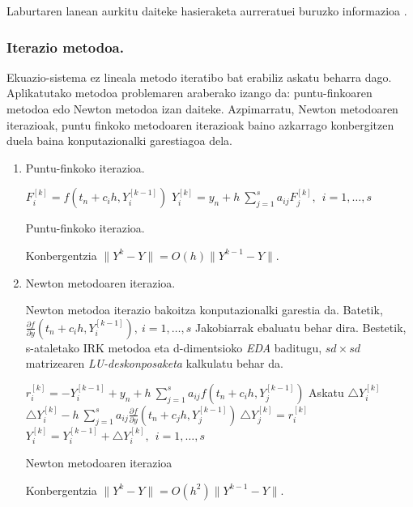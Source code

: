Laburtaren lanean aurkitu daiteke hasieraketa aurreratuei buruzko informazioa \cite{Laburta1998}.  


\subsubsection*{Iterazio metodoa.}

Ekuazio-sistema ez lineala metodo iteratibo bat erabiliz askatu beharra dago. Aplikatutako metodoa problemaren araberako izango da: puntu-finkoaren metodoa edo Newton  metodoa izan daiteke. Azpimarratu, Newton metodoaren iterazioak, puntu finkoko metodoaren iterazioak baino azkarrago konbergitzen duela baina konputazionalki garestiagoa dela. 

\begin{enumerate}

\item Puntu-finkoko iterazioa.


\begin{algorithm}[H]
  {
   $F_{i}^{[k]}=f(t_n+c_ih,Y_i^{[k-1]})$\;
   $Y_{i}^{[k]}=y_{n}+ h \ \sum\limits_{j=1}^{s} a_{ij} F_{j}^{[k]} , \ \  i=1,\dots,s$\; 
  }
 \caption{Puntu-finkoko iterazioa.}
\end{algorithm}

Konbergentzia $\|Y^k-Y\|=O(h) \|Y^{k-1}-Y\|$.


\item Newton metodoaren iterazioa. 

Newton metodoa iterazio bakoitza konputazionalki garestia da. Batetik,  $\frac{\partial f}{\partial y}(t_n+c_ih,Y_i^{[k-1]}), \ i=1,\dots,s$ Jakobiarrak ebaluatu behar dira. Bestetik, s-ataletako IRK metodoa eta  d-dimentsioko \emph{EDA} baditugu, $sd \times sd$ matrizearen \emph{LU-deskonposaketa} kalkulatu behar da.    


\begin{algorithm}[H]
  {
   $r_{i}^{[k]}=-Y_i^{[k-1]}+y_n+h \ \sum\limits_{j=1}^{s} a_{ij} f(t_n+c_ih,Y_j^{[k-1]}) $\;
   Askatu $\triangle Y_i^{[k]}$\;
   $\triangle Y_i^{[k]}-h \ \sum\limits_{j=1}^{s} a_{ij} \frac{\partial f}{\partial y}(t_n+c_jh,Y_j^{[k-1]}) \ \triangle Y_j^{[k]}=r_i^{[k]}$\;
   $Y_i^{[k]}=Y_i^{[k-1]}+\triangle Y_i^{[k]}, \ \  i=1,\dots,s$\; 
  }
 \caption{Newton metodoaren iterazioa}
\end{algorithm}

Konbergentzia $\|Y^k-Y\|=O(h^2) \|Y^{k-1}-Y\|$.

\end{enumerate}

